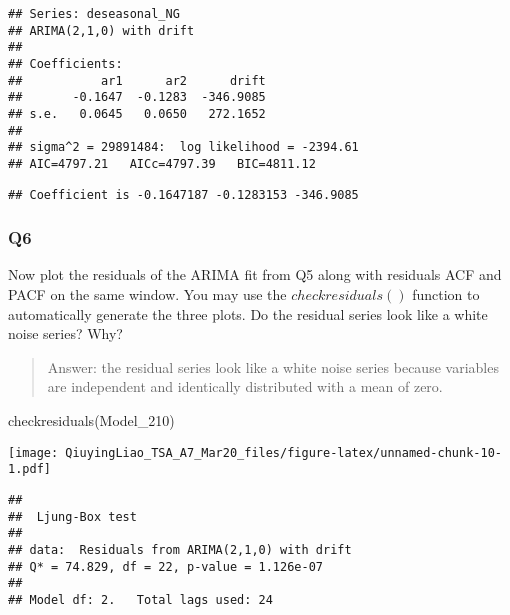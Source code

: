 \documentclass[
]{article}
\newenvironment{Shaded}{\begin{snugshade}}{\end{snugshade}}
\newcommand{\FunctionTok}[1]{\textcolor[rgb]{0.00,0.00,0.00}{#1}}
\newcommand{\NormalTok}[1]{#1}
\newcommand{\SpecialCharTok}[1]{\textcolor[rgb]{0.00,0.00,0.00}{#1}}
\newcommand{\StringTok}[1]{\textcolor[rgb]{0.31,0.60,0.02}{#1}}
\begin{document}
\begin{verbatim}
## Series: deseasonal_NG 
## ARIMA(2,1,0) with drift 
## 
## Coefficients:
##           ar1      ar2      drift
##       -0.1647  -0.1283  -346.9085
## s.e.   0.0645   0.0650   272.1652
## 
## sigma^2 = 29891484:  log likelihood = -2394.61
## AIC=4797.21   AICc=4797.39   BIC=4811.12
\end{verbatim}

\begin{Shaded}
\end{Shaded}

\begin{verbatim}
## Coefficient is -0.1647187 -0.1283153 -346.9085
\end{verbatim}

\hypertarget{q6}{%
\subsubsection{Q6}\label{q6}}

Now plot the residuals of the ARIMA fit from Q5 along with residuals ACF
and PACF on the same window. You may use the \(checkresiduals()\)
function to automatically generate the three plots. Do the residual
series look like a white noise series? Why?

\begin{quote}
Answer: the residual series look like a white noise series because
variables are independent and identically distributed with a mean of
zero.
\end{quote}

\begin{Shaded}
\begin{Highlighting}[]
\FunctionTok{checkresiduals}\NormalTok{(Model\_210)}
\end{Highlighting}
\end{Shaded}

\texttt{[image: QiuyingLiao\_TSA\_A7\_Mar20\_files/figure-latex/unnamed-chunk-10-1.pdf]}

\begin{verbatim}
## 
##  Ljung-Box test
## 
## data:  Residuals from ARIMA(2,1,0) with drift
## Q* = 74.829, df = 22, p-value = 1.126e-07
## 
## Model df: 2.   Total lags used: 24
\end{verbatim}
\end{document}
